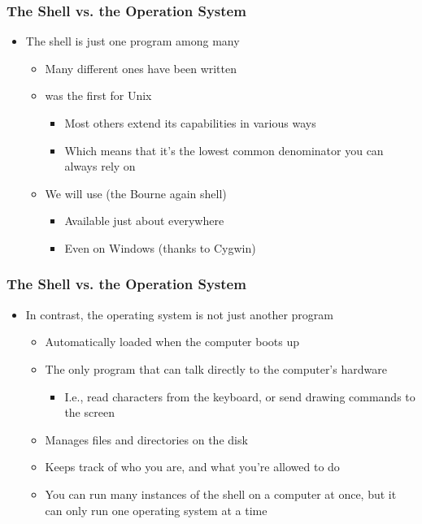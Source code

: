 \begin{frame}\frametitle{The Shell vs. the Operation System}

\begin{itemize}
\item The shell is just one program among many
\begin{itemize}
    \item Many different ones have been written
    \item {} was the first for Unix
	\begin{itemize}
          \item Most others extend its capabilities in various ways
          \item Which means that it's the lowest common denominator you can always rely on
	\end{itemize}
    \item We will use  (the Bourne again shell)
\begin{itemize}
          \item Available just about everywhere
          \item Even on Windows (thanks to Cygwin)
\end{itemize}
\end{itemize}
\end{itemize}
\end{frame}
\begin{frame}\frametitle{The Shell vs. the Operation System}
\begin{itemize}
\item In contrast, the operating system is not just another program
\begin{itemize}
    \item Automatically loaded when the computer boots up
    \item The only program that can talk directly to the computer's hardware
\begin{itemize}
          \item I.e., read characters from the keyboard, or send drawing commands to the screen
\end{itemize}
    \item Manages files and directories on the disk
    \item Keeps track of who you are, and what you're allowed to do
    \item You can run many instances of the shell on a computer at once, but it can only run one operating system at a time
\end{itemize}
\end{itemize}
\end{frame}

